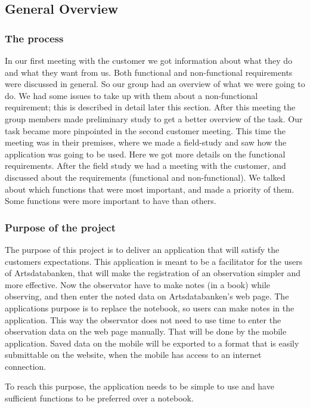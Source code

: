 \subsection{General Overview}

\subsubsection{ The process}
	In our first meeting with the customer we got information about what they do and what they want from us. Both functional and non-functional requirements were discussed in general. So our group had an overview of what we were going to do. We had some issues to take up with them about a non-functional requirement; this is described in detail later this section. After this meeting the group members made preliminary study to get a better overview of the task.
\indent Our task became more pinpointed in the second customer meeting. This time the meeting was in their premises, where we made a field-study and saw how the application was going to be used. Here we got more details on the functional requirements. After the field study we had a meeting with the customer, and discussed about the requirements (functional and non-functional). We talked about which functions that were most important, and made a priority of them. Some functions were more important to have than others.



\subsubsection{Purpose of the project}

The purpose of this project is to deliver an application that will satisfy the customers expectations.  
This application is meant to be a facilitator for the users of Artsdatabanken, that will make the registration of an observation simpler and more effective. Now the observator have to make notes (in a book) while observing, and then enter the noted data on Artsdatabanken's web page. The applications purpose is to replace the notebook, so users can make notes in the application. This way the observator does not need to use time to enter the observation data on the web page manually. That will be done by the mobile application. Saved data on the mobile will be exported to a format that is easily submittable on the website, when the mobile has access to an internet connection.

To reach this purpose, the application needs to be simple to use and have sufficient functions to be preferred over a notebook. 



